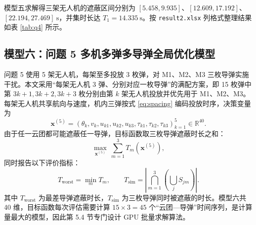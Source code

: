 \documentclass[11pt,a4paper]{ctexart}
\begin{document}
模型五求解得三架无人机的遮蔽区间分别为 $[5.458,\allowbreak 9.935]$、$[12.609,\allowbreak 17.192]$、$[22.194,\allowbreak 27.469]~\mathrm{s}$，并集时长达 $T_1=14.335~\mathrm{s}$。按 \texttt{result2.xlsx} 列格式整理结果如表 \ref{tab:q4} 所示。

\begin{table}[H]
\centering
\caption{问题 4 最优投放策略（result2.xlsx 格式）}
\label{tab:q4}
\scriptsize
{}
\end{table}

\subsection{模型六：问题 5 多机多弹多导弹全局优化模型}

问题 5 使用 5 架无人机，每架至多投放 3 枚弹，对 M1、M2、M3 三枚导弹实施干扰。本文采用“每架无人机 3 弹、分别对应一枚导弹”的满配方案，即 15 枚弹中第 $3k+1,3k+2,3k+3$ 枚分别由第 $k$ 架无人机投放并优先用于 M1、M2、M3。每架无人机共享航向与速度，机内三弹按式 \eqref{eq:spacing} 编码投放时序，决策变量为
\begin{equation}
  \bm{x}^{(5)}=\left(\theta_k,v_k,u_{k1},u_{k2},u_{k3},\tau_{k1},\tau_{k2},\tau_{k3}\right)_{k=1}^{5}
  \in\mathbb{R}^{40}.
  \label{eq:x5}
\end{equation}
由于任一云团都可能遮蔽任一导弹，目标函数取三枚导弹遮蔽时长之和：
\begin{equation}
  \max_{\bm{x}^{(5)}}\ \sum_{m=1}^{3}T_m(\bm{x}^{(5)}),
  \label{eq:obj5}
\end{equation}
同时报告以下评价指标：
\begin{equation}
  T_{\mathrm{worst}}=\min_{m}T_m,\qquad
  T_{\mathrm{sim}}=\left|\bigcap_{m=1}^{3}\left(\bigcup_j S_{jm}\right)\right|.
  \label{eq:metrics}
\end{equation}
其中 $T_{\mathrm{worst}}$ 为最差导弹遮蔽时长，$T_{\mathrm{sim}}$ 为三枚导弹同时被遮蔽的时长。模型六共 40 维，目标函数每次评估需要计算 $15\times 3=45$ 个“云团—导弹”时间序列，是计算量最大的模型，因此第 5.4 节专门设计 GPU 批量求解算法。
\end{document}
